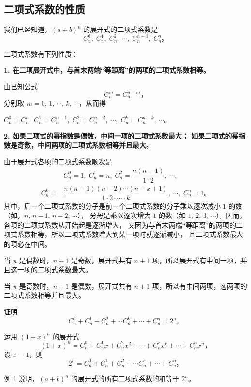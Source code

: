 \subsection{二项式系数的性质}\label{subsec:2-8}

我们已经知道，$(a + b)^n$ 的展开式的二项式系数是
$$ C_n^0,\; C_n^1,\; C_n^2,\; \cdots,\; C_n^{n-1},\; C_n^n \text{。} $$

二项式系数有下列性质：

\textbf{1. 在二项展开式中，与首末两端“等距离”的两项的二项式系数相等。}

由已知公式
$$ C_n^m = C_n^{n-m} \text{，} $$
分别取 $m = 0,\, 1,\, \cdots,\, k,\, \cdots$，从而得

$C_n^0 = C_n^n,\; C_n^1 = C_n^{n-1},\; C_n^2 = C_n^{n-2},\; \cdots,\; C_n^k = C_n^{n-k},\; \cdots $。

\textbf{2. 如果二项式的幂指数是偶数，中间一项的二项式系数最大；
如果二项式的幂指数是奇数，中间两项的二项式系数相等并且最大。}

由于展开式各项的二项式系数顺次是
\begin{align*}
    & C_n^0 = 1,\; C_n^1 = n,\; C_n^2 = \dfrac{n(n-1)}{1 \cdot 2},\; \cdots, \\
    C_n^k =& \dfrac{n (n-1) (n-2) \cdots (n-k+1)}{1 \cdot 2 \cdot \cdots \cdot k},\; \cdots,\; C_n^n = 1 \text{。}
\end{align*}
其中，后一个二项式系数的分子是前一个二项式系数的分子乘以逐次减小 $1$ 的数（如，$n,\, n-1,\, n-2,\, \cdots$），
分母是乘以逐次增大 $1$ 的数（如 $1,\, 2,\, 3,\, \cdots$），因而，各项的二项式系数从开始起是逐渐增大，
又因为与首末两端“等距离”的两项的二项式系数相等，所以二项式系数增大到某一项时就逐渐减小，
且二项式系数最大的项必在中间。

当 $n$ 是偶数时，$n+1$ 是奇数，展开式共有 $n+1$ 项，所以展开式有中间一项，并且这一项的二项式系数最大。

当 $n$ 是奇数时，$n+1$ 是偶数，展开式共有 $n+1$ 项，所以有中间两项，这两项的二项式系数相等并且最大。


\liti 证明
$$ C_n^0 + C_n^1 + C_n^2 + \cdots  C_n^k + \cdots + C_n^n = 2^n \text{。} $$

\zhengming 运用 $(1 + x)^n$ 的展开式
$$ (1 + x)^n = C_n^0 + C_n^1 x + C_n^2 x^2 + \cdots + C_n^r x^r + \cdots + C_n^n x^n \text{，} $$
设 $x = 1$，则
$$ 2^n = C_n^0 + C_n^1 + C_n^2 + \cdots  C_n^r + \cdots + C_n^n \text{。} $$

例 1 说明，$(a + b)^n$ 的展开式的所有二项式系数的和等于 $2^n$。



